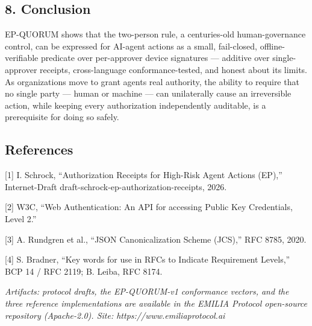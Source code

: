 \documentclass[
  11pt,
]{article}
\begin{document}
\subsection{8. Conclusion}\label{conclusion}

EP-QUORUM shows that the two-person rule, a centuries-old
human-governance control, can be expressed for AI-agent actions as a
small, fail-closed, offline-verifiable predicate over per-approver
device signatures --- additive over single-approver receipts,
cross-language conformance-tested, and honest about its limits. As
organizations move to grant agents real authority, the ability to
require that no single party --- human or machine --- can unilaterally
cause an irreversible action, while keeping every authorization
independently auditable, is a prerequisite for doing so safely.

\subsection{References}\label{references}

{[}1{]} I. Schrock, ``Authorization Receipts for High-Risk Agent Actions
(EP),'' Internet-Draft draft-schrock-ep-authorization-receipts, 2026.

{[}2{]} W3C, ``Web Authentication: An API for accessing Public Key
Credentials, Level 2.''

{[}3{]} A. Rundgren et al., ``JSON Canonicalization Scheme (JCS),'' RFC
8785, 2020.

{[}4{]} S. Bradner, ``Key words for use in RFCs to Indicate Requirement
Levels,'' BCP 14 / RFC 2119; B. Leiba, RFC 8174.

\emph{Artifacts: protocol drafts, the EP-QUORUM-v1 conformance vectors,
and the three reference implementations are available in the EMILIA
Protocol open-source repository (Apache-2.0). Site:
https://www.emiliaprotocol.ai}
\end{document}
